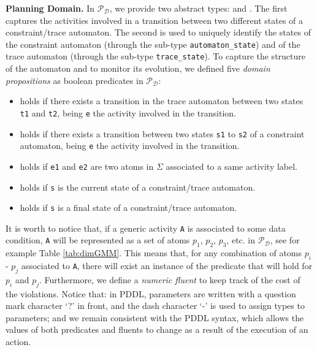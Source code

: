 \medskip
\noindent
\textbf{Planning Domain.}
%
In $\mathcal{P_D}$, we provide two abstract types:  and .
%
The first captures the activities involved in a transition between two different states of a constraint/trace automaton.
%
The second is used to uniquely identify the states of the constraint automaton (through the sub-type \texttt{automaton\_state}) and of the trace automaton (through the sub-type \texttt{trace\_state}).
%
To capture the structure of the automaton and to monitor its evolution, we defined five \emph{domain propositions} as boolean predicates in $\mathcal{P_D}$:
%
\begin{itemize}
	\item {} holds if there exists a transition in the trace automaton between two states \texttt{t1} and \texttt{t2}, being \texttt{e} the activity involved in the transition.
	\item {} holds if there exists a transition between two states \texttt{s1} to \texttt{s2} of a constraint automaton, being \texttt{e} the activity involved in the transition.
    \item {} holds if \texttt{e1} and \texttt{e2} are two atoms in $\Sigma$ associated to a same activity label.
	\item {} holds if \texttt{s} is the current state of a constraint/trace automaton.
	\item {} holds if \texttt{s} is a final state of a constraint/trace automaton.
\end{itemize}
It is worth to notice that, if a generic activity \texttt{A} is associated to some data condition, \texttt{A} will be represented as a set of atoms $p_1$, $p_2$, $p_3$, etc. in $\mathcal{P_D}$, see for example Table \ref{tab:dimGMM}. This means that, for any combination of atoms $p_i$ - $p_j$ associated to \texttt{A}, there will exist an instance of the predicate  that will hold for $p_i$ and $p_j$.
%
%
Furthermore, we define a \emph{numeric fluent}  to keep track of the cost of the violations. Notice that: \myi in PDDL, parameters are written with a question mark character `?' in front, and the dash character `-' is used to assign types to parameters; and \myii we remain consistent with the PDDL syntax, which allows the values of both predicates and fluents to change as a result of the execution of an action.
%

